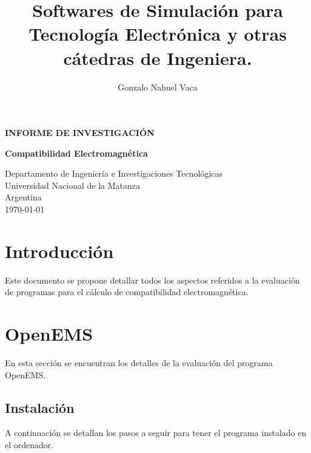 \documentclass[
    11pt,
    spanish,
	a4paper
]{article}
\title{Softwares de Simulación para Tecnología Electrónica y otras cátedras de
  Ingeniera.}
\author{Gonzalo Nahuel Vaca}
\def\doctype{INFORME DE INVESTIGACIÓN}
\begin{document}
\makeatletter
\begin{titlepage}
	\begin{center}
		\vspace*{1cm}
		
		\Huge
		\textbf{\doctype}
		\vspace{0.5cm}
    
		\LARGE
		\@title
		\vspace{0.5cm}
    
		\textbf{Compatibilidad Electromagnética}
		
		\vspace{1.5cm}
		
		\textbf{\@author}

		\vspace{3.5cm}

		
		\vfill
		Departamento de Ingeniería e Investigaciones Tecnológicas\\
		Universidad Nacional de la Matanza\\
		Argentina\\
		\today
	\end{center}
\end{titlepage}
\makeatother
\newpage

\section{Introducción}
\label{sec:introduccion}

Este documento se propone detallar todos los aspectos referidos a la evaluación
de programas para el cálculo de compatibilidad electromagnética.

\section{OpenEMS}
\label{sec:openems}

En esta sección se encuentran los detalles de la evaluación del programa OpenEMS.

\subsection{Instalación}
\label{sub:oinstalacion}

A continuación se detallan los pasos a seguir para tener el programa instalado
en el ordenador.
\end{document}
